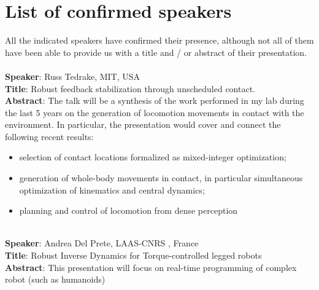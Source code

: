 \documentclass[conference]{IEEEtran}
\begin{document}
\section{List of confirmed speakers}

All the indicated speakers have confirmed their presence, although not all of them have been able to provide us with a title and / or abstract
of their presentation.\\ \\
\textbf{Speaker}: Russ Tedrake, MIT, USA \\
\textbf{Title}:  Robust feedback stabilization through unscheduled contact.\\
\textbf{Abstract}: The talk will be a synthesis of the work performed in my lab during the last 5 years on the generation of locomotion movements in contact with the environment. In particular, the presentation would cover and connect the following recent results:
\begin{itemize}
\item selection of contact locations formalized as mixed-integer optimization;
\item generation of whole-body movements in contact, in particular simultaneous optimization of kinematics and  central dynamics;
\item planning and control of locomotion from dense perception \\ \\ 
\end{itemize}
\textbf{Speaker}: Andrea Del Prete, LAAS-CNRS , France \\
\textbf{Title}:  Robust Inverse Dynamics for Torque-controlled legged
robots \\
\textbf{Abstract}: This presentation will focus on real-time
programming of complex robot (such as humanoids)
\end{document}
